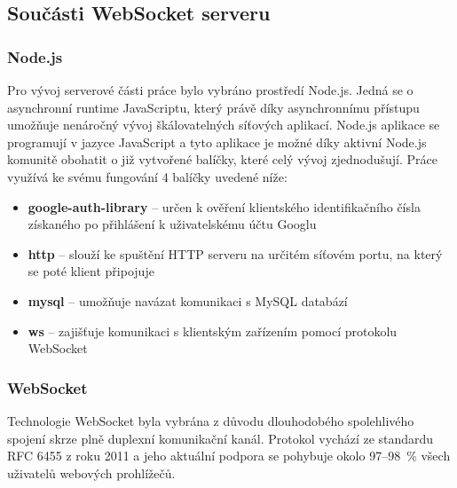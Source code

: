 


\subsection{Součásti WebSocket serveru}
\subsubsection{Node.js}
Pro vývoj serverové části práce bylo vybráno prostředí Node.js.
Jedná se o asynchronní runtime JavaScriptu, který právě díky asynchronnímu přístupu umožňuje nenáročný vývoj škálovatelných síťových aplikací. \cite{web:NodeJS/About}
Node.js aplikace se programují v jazyce JavaScript a tyto aplikace je možné díky aktivní Node.js komunitě obohatit o již vytvořené balíčky, které celý vývoj zjednodušují.
Práce využívá ke svému fungování 4 balíčky uvedené níže:
\begin{itemize}
	\item \textbf{google-auth-library} -- určen k ověření klientského identifikačního čísla získaného po přihlášení k uživatelskému účtu Googlu
	\item \textbf{http} -- slouží ke spuštění HTTP serveru na určitém síťovém portu, na který se poté klient připojuje
	\item \textbf{mysql} -- umožňuje navázat komunikaci s MySQL databází
	\item \textbf{ws} -- zajišťuje komunikaci s klientským zařízením pomocí protokolu WebSocket
\end{itemize}


\subsubsection{WebSocket}
Technologie WebSocket byla vybrána z důvodu dlouhodobého spolehlivého spojení skrze plně duplexní komunikační kanál. \cite{book:AndrewLombardi/WebSocket}
Protokol vychází ze standardu RFC 6455 z roku 2011 a jeho aktuální podpora se pohybuje okolo 97--98~\% všech uživatelů webových prohlížečů. \cite{web:IETF/rfc6455}\cite{web:CanIUse/WebSockets}


